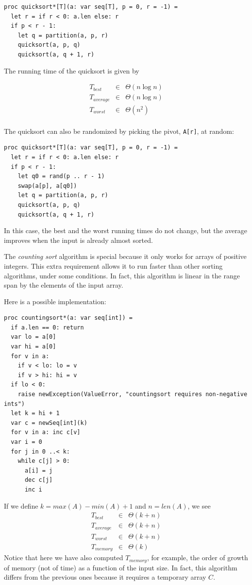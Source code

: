 \documentclass[justified, sixbynine]{tufte-book}
\def\ft{\small\tt}
\theoremstyle{plain}%
\newtheorem * {corollary}{Corollary}
\theoremstyle{definition}
\theoremstyle{remark}
\newtheorem * {remark}{Remark}
\newtheorem * {note}{Note}
\begin{document}
\begin{fullwidth}
\begin{lstlisting}
proc quicksort*[T](a: var seq[T], p = 0, r = -1) =
  let r = if r < 0: a.len else: r
  if p < r - 1:
    let q = partition(a, p, r)
    quicksort(a, p, q)
    quicksort(a, q + 1, r)
\end{lstlisting}

The running time of the quicksort is given by

\begin{eqnarray}
T_{best} &\in &\Theta (n\log n) \\
T_{average} &\in &\Theta (n\log n) \\
T_{worst} &\in &\Theta (n^2) \\
\end{eqnarray}

The quicksort can also be randomized by picking the pivot, {\ft A[r]}, at random:
\begin{lstlisting}
proc quicksort*[T](a: var seq[T], p = 0, r = -1) =
  let r = if r < 0: a.len else: r
  if p < r - 1:
    let q0 = rand(p .. r - 1)
    swap(a[p], a[q0])
    let q = partition(a, p, r)
    quicksort(a, p, q)
    quicksort(a, q + 1, r)
\end{lstlisting}

In this case, the best and the worst running times do not change, but the average improves when the input is already almost sorted.


The {\it counting sort} algorithm is special because it only works for arrays of positive integers. This extra requirement allows it to run faster than other sorting algorithms, under some conditions. In fact, this algorithm is linear in the range span by the elements of the input array.

Here is a possible implementation:
\begin{lstlisting}
proc countingsort*(a: var seq[int]) =
  if a.len == 0: return
  var lo = a[0]
  var hi = a[0]
  for v in a:
    if v < lo: lo = v
    if v > hi: hi = v
  if lo < 0:
    raise newException(ValueError, "countingsort requires non-negative ints")
  let k = hi + 1
  var c = newSeq[int](k)
  for v in a: inc c[v]
  var i = 0
  for j in 0 ..< k:
    while c[j] > 0:
      a[i] = j
      dec c[j]
      inc i
\end{lstlisting}

If we define $k=max(A)-min(A)+1$ and $n=len(A)$, we see
\begin{eqnarray}
T_{best} &\in &\Theta (k+n) \\
T_{average} &\in &\Theta (k+n) \\
T_{worst} &\in &\Theta (k+n) \\
T_{memory} &\in &\Theta (k)
\end{eqnarray}
Notice that here we have also computed $T_{memory}$, for example, the order of growth of memory (not of time) as a function of the input size. In fact, this algorithm differs from the previous ones because it requires a temporary array $C$.


\end{fullwidth}
\end{document}
